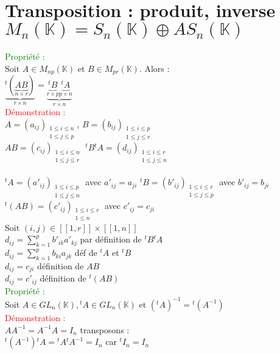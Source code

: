 \documentclass{article}
\begin{document}
	\section{Transposition : produit, inverse $M_n(\mathbb K)= S_n(\mathbb K) \oplus AS_n(\mathbb K)$}
	\textcolor{green}{Propriété :} \\
	Soit $A \in M_{np}( \mathbb K)$ et $B \in  M_{pr}(\mathbb K)$. Alors : \\
	 \indent $ \underbrace{{}^t(\underbrace{AB}_{n \times r})}_{r \times n}=\underbrace{\underbrace{{}^t B}_{r \times p}  \underbrace{{}^tA}_{p \times n}}_{r \times n}$ \\
	 \textcolor{red}{Démonstration :} \\
	 $A=(a_{ij}){}_{\substack{1\leq i\leq n \\ 1\leq j\leq p}}$,
	 $B=(b_{ij}){}_{\substack{1\leq i\leq p \\ 1\leq j\leq r}}$ \\
	 $AB=(c_{ij}){}_{\substack{1\leq i\leq n \\ 1\leq j\leq r}}$
	 ${}^tB{}^tA=(d_{ij}){}_{\substack{1\leq i\leq r \\ 1\leq j\leq n}}$ \\ \\
	 ${}^tA=(a'_{ij}){}_{\substack{1\leq i\leq p \\ 1\leq j\leq n}}$ avec $a'_{ij}=a_{ji}$
	 ${}^t B=(b'_{ij}){}_{\substack{1\leq i\leq r \\ 1\leq j\leq p}}$ avec $b'_{ij}=b_{ji}$
	 ${}^t(AB)=(c'_{ij}){}_{\substack{1\leq i\leq r \\ 1\leq n}}$ avec  $c'_{ij}=c_{ji}$ \\
	 Soit $(i,j) \in [[1,r]] \times [[1,n]]$ \\
	 $d_{ij} = \sum_{k=1}^p b'_{ik}a'_{kj}$ par définition de ${}^t B {}^t A$ \\
	 $d_{ij} =\sum_{k=1}^p b_{ki}a_{jk}$ déf de ${}^t A$ et ${}^tB$ \\
	 $d_{ij}=c_{ji}$ définition de $AB$ \\
	 $d_{ij}=c'_{ij}$ définition de ${}^t (AB)$ \\
\textcolor{green}{Propriété :} \\
Soit $A \in GL_n ( \mathbb K), {}^tA \in GL_n(\mathbb K)$ et $({}^tA)^{-1}={}^t(A^{-1})$ \\
\textcolor{red}{Démonstration :} \\
$AA^{-1}=A^{-1}A=I_n$ transposons : \\
${}^t (A^{-1}){}^tA= {}^t A {}^t A^{-1}=I_n$ car ${}^t I_n=I_n$ \\
\end{document}
